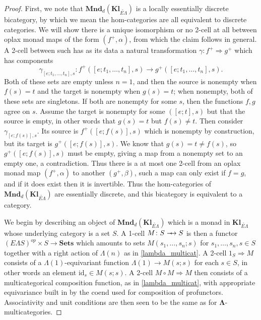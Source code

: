 \documentclass{amsbook} %
\newcommand{\mb}{\mathbf}
\newcommand{\id}{\textrm{id}}
\def\srarrow{\relbar\joinrel\mapstochar\joinrel\rightarrow}
\numberwithin{section}{chapter}
\begin{document}
\begin{proof}
First, we note that $\mb{Mnd}_{d}(\mb{Kl}_{\widetilde{E\Lambda}})$ is a locally essentially discrete bicategory, by which we mean the hom-categories are all equivalent to discrete categories.  We will show there is a unique isomorphism or no 2-cell at all between oplax monad maps of the form $(f^{+}, \alpha)$, from which the claim follows in general.  A 2-cell between such has as its data a natural transformation $\gamma \colon f^{+} \Rightarrow g^{+}$ which has components
\[
\gamma_{[e; t_1, \ldots, t_n], s} \colon f^{+}([e; t_1, \ldots, t_n], s) \to g^{+}([e; t_1, \ldots, t_n], s).
\]
Both of these sets are empty unless $n=1$, and then the source is nonempty when $f(s) = t$ and the target is nonempty when $g(s)=t$; when nonempty, both of these sets are singletons.  If both are nonempty for some $s$, then the functions $f,g$ agree on $s$.  Assume the target is nonempty for some $([e;t], s)$ but that the source is empty, in other words that $g(s)=t$ but $f(s) \neq t$.  Then consider $\gamma_{[e;f(s)], s}$.  Its source is $f^{+}([e;f(s)], s)$ which is nonempty by construction, but its target is $g^{+}([e;f(s)], s)$.  We know that $g(s) = t \neq f(s)$, so $g^{+}([e;f(s)], s)$ must be empty, giving a map from a nonempty set to an empty one, a contradiction.  Thus there is a at most one 2-cell from an oplax monad map $(f^{+}, \alpha)$ to another $(g^{+}, \beta)$, such a map can only exist if $f = g$, and if it does exist then it is invertible.  Thus the hom-categories of $\mb{Mnd}_{d}(\mb{Kl}_{\widetilde{E\Lambda}})$ are essentially discrete, and this bicategory is equivalent to a category.

We begin by describing an object of $\mb{Mnd}_{d}(\mb{Kl}_{\widetilde{E\Lambda}})$ which is a monad in $\mb{Kl}_{\widetilde{E\Lambda}}$ whose underlying category is a set $S$.  A 1-cell $M \colon S \srarrow S$ is then a functor $(E\Lambda S)^{op} \times S \to \mb{Sets}$ which amounts to sets $M(s_1, \ldots, s_n; s)$ for $s_1, \ldots, s_n, s \in S$ together with a right action of $\Lambda(n)$ as in \ref{lambda_multicat}.  A 2-cell $1_{S} \Rightarrow M$ consists of a $\Lambda(1)$-equivariant function $\Lambda(1) \to M(s;s)$ for each $s \in S$, in other words an element $\id_{s} \in M(s;s)$.  A 2-cell $M \circ M \Rightarrow M$ then consists of a multicategorical composition function, as in \ref{lambda_multicat}, with appropriate equivariance built in by the coend used for composition of profunctors.  Associativity and unit conditions are then seen to be the same as for $\mb{\Lambda}$-multicategories.


\end{proof}
\end{document}
